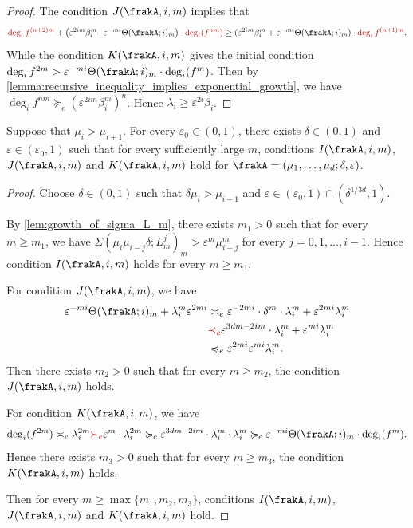\begin{proof}
	The condition $J(\frakA,i,m)$ implies that
	\[ \alert{\deg_i f^{(n+2)m}} + \left(\varepsilon^{2im} \beta_i^m \cdot \varepsilon^{-mi} \Theta(\frakA; i)_m\right) \cdot \alert{\deg_i(f^{nm})} \geq (\varepsilon^{2im} \beta_i^m + \varepsilon^{-mi} \Theta(\frakA; i)_m) \cdot \alert{\deg_i f^{(n+1)m}}. \]
	While the condition $K(\frakA,i,m)$ gives the initial condition $\deg_i f^{2m} > \varepsilon^{-mi} \Theta(\frakA; i)_m \cdot \deg_i(f^{m})$.
	Then by \cref{lemma:recursive_inequality_implies_exponential_growth}, we have $\deg_i f^{nm} \succcurlyeq_e (\varepsilon^{2im} \beta_i^m)^n$.
	Hence $\lambda_i \geq \varepsilon^{2i} \beta_i$.
\end{proof}


\begin{theorem}\label{thm:lambda_i_satisfy_conditions_IJK}
	Suppose that $\mu_i > \mu_{i+1}$.
	For every $\varepsilon_0 \in (0, 1)$, there exists $\delta \in (0, 1)$ and $\varepsilon \in (\varepsilon_0, 1)$ such that for every sufficiently large $m$, conditions $I(\frakA,i,m)$, $J(\frakA,i,m)$ and $K(\frakA,i,m)$ hold for $\frakA = (\mu_1, \ldots, \mu_d; \delta, \varepsilon)$.
\end{theorem}
\begin{proof}
	Choose $\delta \in (0, 1)$ such that $\delta \mu_i > \mu_{i+1}$ and $\varepsilon \in (\varepsilon_0, 1) \cap (\delta^{1/3d}, 1)$.

	By \cref{lem:growth_of_sigma_L_m}, there exists $m_1 > 0$ such that for every $m \geq m_1$, we have $\Sigma(\mu_i \mu_{i-j} \delta; L_m^j)_m > \varepsilon^m \mu_{i-j}^m$ for every $j = 0, 1, \ldots, i-1$.
	Hence condition $I(\frakA,i,m)$ holds for every $m \geq m_1$.

	For condition $J(\frakA,i,m)$, we have
	\begin{align*}
		\varepsilon^{-mi}\Theta(\frakA; i)_m + \lambda_i^m \varepsilon^{2mi} & \asymp_e \varepsilon^{-2mi} \cdot \delta^m \cdot \lambda_i^m + \varepsilon^{2mi} \lambda_i^m \\
		                                                                     & \alert{\prec_e} \varepsilon^{3dm-2im} \cdot \lambda_i^m + \varepsilon^{mi} \lambda_i^m       \\
		                                                                     & \preccurlyeq_e \varepsilon^{2mi} \varepsilon^{mi} \lambda_i^m.
	\end{align*}
	Then there exists $m_2 > 0$ such that for every $m \geq m_2$, the condition $J(\frakA,i,m)$ holds.

	For condition $K(\frakA,i,m)$, we have
	\begin{align*}
		\deg_i(f^{2m}) \asymp_e \lambda_i^{2m} \alert{\succ_e} \varepsilon^{m} \cdot \lambda_i^{2m} \succcurlyeq_e \varepsilon^{3dm-2im} \cdot \lambda_i^m \cdot \lambda_i^m \succcurlyeq_e \varepsilon^{-mi} \Theta(\frakA; i)_m \cdot \deg_i(f^{m}).
	\end{align*}
	Hence there exists $m_3 > 0$ such that for every $m \geq m_3$, the condition $K(\frakA,i,m)$ holds.

	Then for every $m \geq \max\{m_1, m_2, m_3\}$, conditions $I(\frakA,i,m)$, $J(\frakA,i,m)$ and $K(\frakA,i,m)$ hold.
\end{proof}


